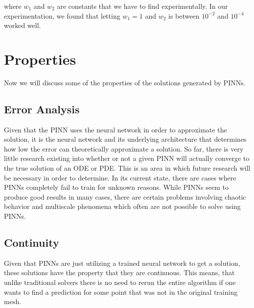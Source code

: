 \documentclass{article}
\begin{document}
where $w_1$ and $w_2$ are constants that we have to find experimentally. In our experimentation, we found that letting $w_1 = 1$ and $w_2$ is between $10^{-2}$ and $10^{-4}$ worked well.


\section{Properties}

Now we will discuss some of the properties of the solutions generated by PINNs.

\subsection{Error Analysis}

Given that the PINN uses the neural network in order to approximate the solution, it is the neural network and its underlying architecture that determines how low the error can theoretically approximate a solution. So far, there is very little research existing into whether or not a given PINN will actually converge to the true solution of an ODE or PDE. This is an area in which future research will be necessary in order to determine. In its current state, there are cases where PINNs completely fail to train for unknown reasons. While PINNs seem to produce good results in many cases, there are certain problems involving chaotic behavior and multiscale phenomena which often are not possible to solve using PINNs.

\subsection{Continuity}

Given that PINNs are just utilizing a trained neural network to get a solution, these solutions have the property that they are continuous. This means, that unlike traditional solvers there is no need to rerun the entire algorithm if one wants to find a prediction for some point that was not in the original training mesh.
\end{document}
